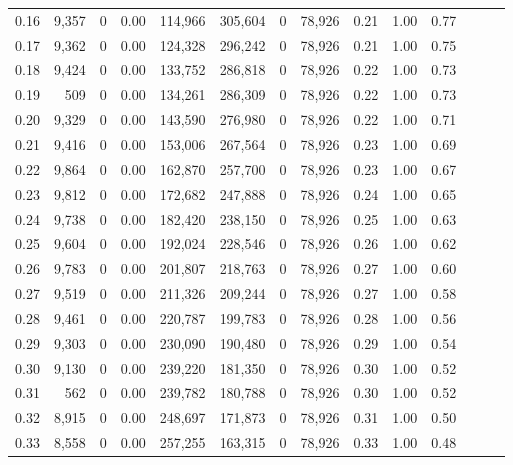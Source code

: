\begin{tabular}{rrrrrrrrrrrrrr}
0.16 &   9,357 &      0 &  0.00 &  114,966 &  305,604 &       0 &  78,926 &  0.21 &  1.00 &      0.77 \\
0.17 &   9,362 &      0 &  0.00 &  124,328 &  296,242 &       0 &  78,926 &  0.21 &  1.00 &      0.75 \\
0.18 &   9,424 &      0 &  0.00 &  133,752 &  286,818 &       0 &  78,926 &  0.22 &  1.00 &      0.73 \\
0.19 &     509 &      0 &  0.00 &  134,261 &  286,309 &       0 &  78,926 &  0.22 &  1.00 &      0.73 \\
0.20 &   9,329 &      0 &  0.00 &  143,590 &  276,980 &       0 &  78,926 &  0.22 &  1.00 &      0.71 \\
0.21 &   9,416 &      0 &  0.00 &  153,006 &  267,564 &       0 &  78,926 &  0.23 &  1.00 &      0.69 \\
0.22 &   9,864 &      0 &  0.00 &  162,870 &  257,700 &       0 &  78,926 &  0.23 &  1.00 &      0.67 \\
0.23 &   9,812 &      0 &  0.00 &  172,682 &  247,888 &       0 &  78,926 &  0.24 &  1.00 &      0.65 \\
0.24 &   9,738 &      0 &  0.00 &  182,420 &  238,150 &       0 &  78,926 &  0.25 &  1.00 &      0.63 \\
0.25 &   9,604 &      0 &  0.00 &  192,024 &  228,546 &       0 &  78,926 &  0.26 &  1.00 &      0.62 \\
0.26 &   9,783 &      0 &  0.00 &  201,807 &  218,763 &       0 &  78,926 &  0.27 &  1.00 &      0.60 \\
0.27 &   9,519 &      0 &  0.00 &  211,326 &  209,244 &       0 &  78,926 &  0.27 &  1.00 &      0.58 \\
0.28 &   9,461 &      0 &  0.00 &  220,787 &  199,783 &       0 &  78,926 &  0.28 &  1.00 &      0.56 \\
0.29 &   9,303 &      0 &  0.00 &  230,090 &  190,480 &       0 &  78,926 &  0.29 &  1.00 &      0.54 \\
0.30 &   9,130 &      0 &  0.00 &  239,220 &  181,350 &       0 &  78,926 &  0.30 &  1.00 &      0.52 \\
0.31 &     562 &      0 &  0.00 &  239,782 &  180,788 &       0 &  78,926 &  0.30 &  1.00 &      0.52 \\
0.32 &   8,915 &      0 &  0.00 &  248,697 &  171,873 &       0 &  78,926 &  0.31 &  1.00 &      0.50 \\
0.33 &   8,558 &      0 &  0.00 &  257,255 &  163,315 &       0 &  78,926 &  0.33 &  1.00 &      0.48 \\

\end{tabular}
